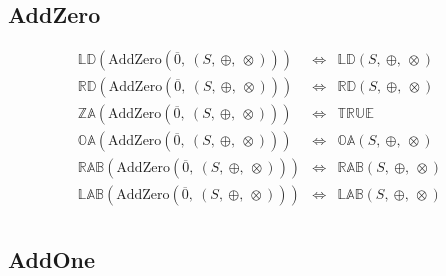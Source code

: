 \documentclass[10pt]{article}
\newcommand{\propname}[1]{{\mathbb{#1}}}
\begin{document}

\subsection{AddZero} 

\[
\begin{array}{rcl} 
\propname{LD}(\mathrm{AddZero}(\overline{0},\ (S,\ \oplus,\ \otimes))) 
    & \Leftrightarrow %
    & \propname{LD}(S,\ \oplus,\ \otimes) \\
\propname{RD}(\mathrm{AddZero}(\overline{0},\ (S,\ \oplus,\ \otimes))) 
    & \Leftrightarrow %
    & \propname{RD}(S,\ \oplus,\ \otimes) \\
\propname{ZA}(\mathrm{AddZero}(\overline{0},\ (S,\ \oplus,\ \otimes))) 
    & \Leftrightarrow %
    & \propname{TRUE}\\ 
\propname{OA}(\mathrm{AddZero}(\overline{0},\ (S,\ \oplus,\ \otimes))) 
    & \Leftrightarrow %
    & \propname{OA}(S,\ \oplus,\ \otimes) \\
\propname{RAB}(\mathrm{AddZero}(\overline{0},\ (S,\ \oplus,\ \otimes))) 
    & \Leftrightarrow %
    & \propname{RAB}(S,\ \oplus,\ \otimes)\\ 
\propname{LAB}(\mathrm{AddZero}(\overline{0},\ (S,\ \oplus,\ \otimes))) 
    & \Leftrightarrow %
    & \propname{LAB}(S,\ \oplus,\ \otimes)\\ 
\end{array} 
\] 

\subsection{AddOne} 

\end{document}
